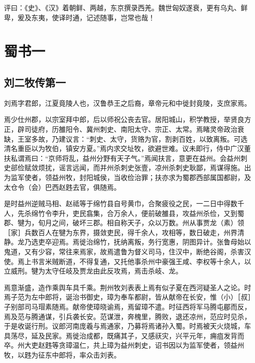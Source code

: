 \documentclass[12pt,UTF8]{ctexbook}
\begin{document}
评曰：《史》、《汉》着朝鲜、两越，东京撰录西羌。魏世匈奴遂衰，更有乌丸、鲜卑，爰及东夷，使译时通，记述随事，岂常也哉！

\part{蜀书一}
\chapter{刘二牧传第一}

刘焉字君郎，江夏竟陵人也，汉鲁恭王之后裔，章帝元和中徙封竟陵，支庶家焉。

焉少仕州郡，以宗室拜中郎，后以师祝公丧去官。居阳城山，积学教授，举贤良方正，辟司徒府，历雒阳令、冀州刺史、南阳太守、宗正、太常。焉睹灵帝政治衰缺，王室多故，乃建议言：“刺史、太守，货赂为官，割剥百姓，以致离叛。可选清名重臣以为牧伯，镇安方夏。”焉内求交址牧，欲避世难。议未即行，侍中广汉董扶私谓焉曰：“京师将乱，益州分野有天子气。”焉闻扶言，意更在益州。会益州刺史郤俭赋敛烦扰，谣言远闻，而并州杀刺史张壹，凉州杀刺史耿鄙，焉谋得施。出为监军使者，领益州牧，封阳城侯，当收俭治罪；扶亦求为蜀郡西部属国都尉，及太仓令（会）巴西赵韪去官，俱随焉。

是时益州逆贼马相、赵祗等于绵竹县自号黄巾，合聚疲役之民，一二日中得数千人，先杀绵竹令李升，吏民翕集，合万余人，便前破雒县，攻益州杀俭，又到蜀郡、犍为，旬月之间，破坏三郡。相自称天子，众以万数。州从事贾龙（素）领［家］兵数百人在犍为东界，摄敛吏民，得千余人，攻相等，数日破走，州界清静。龙乃选吏卒迎焉。焉徙治绵竹，抚纳离叛，务行宽惠，阴图异计。张鲁母始以鬼道，又有少容，常往来焉家，故焉遣鲁为督义司马，住汉中，断绝谷阁，杀害汉使。焉上书言米贼断道，不得复通，又托他事杀州中豪强王咸、李权等十余人，以立威刑。犍为太守任岐及贾龙由此反攻焉，焉击杀岐、龙。

焉意渐盛，造作乘舆车具千乘。荆州牧刘表表上焉有似子夏在西河疑圣人之论。时焉子范为左中郎将，诞治书御史，璋为奉车都尉，皆从献帝在长安，惟（小）［叔］子别部司马瑁素随焉。献帝使璋晓谕焉，焉留璋不遣。时征西将军马腾屯郿而反，焉及范与腾通谋，引兵袭长安。范谋泄，奔槐里，腾败，退还凉州，范应时见杀，于是收诞行刑。议郎河南庞羲与焉通家，乃募将焉诸孙入蜀。时焉被天火烧城，车具荡尽，延及民家。焉徙治成都，既痛其子，又感祆灾，兴平元年，痈疽发背而卒。州大吏赵韪等贪璋温仁，共上璋为益州刺史，诏书因以为监军使者，领益州牧，以韪为征东中郎将，率众击刘表。
\end{document}
